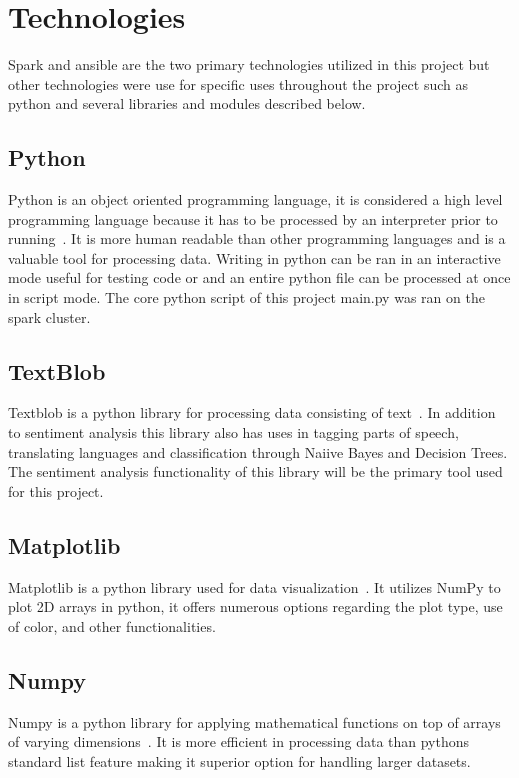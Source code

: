 \section{Technologies}

Spark and ansible are the two primary technologies utilized in this
project but other technologies were use for specific uses throughout
the project such as python and several libraries and modules described below.

\subsection{Python}
Python is an object oriented programming language, it is considered a
high level programming language because it has to be processed by an
interpreter prior to running~\cite{www-python}.  It is more human
readable than other programming languages and is a valuable tool for
processing data.  Writing in python can be ran in an interactive mode
useful for testing code or and an entire python file can be processed
at once in script mode.  The core python script of this project
main.py was ran on the spark cluster.

\subsection{TextBlob}

Textblob is a python library for processing data consisting of
text~\cite{www-textblob}.  In addition to sentiment analysis this
library also has uses in tagging parts of speech, translating languages
and classification through Naiive Bayes and Decision Trees.  The
sentiment analysis functionality of this library will be the primary
tool used for this project.

\subsection{Matplotlib}

Matplotlib is a python library used for data
visualization~\cite{www-matplot}.  It utilizes NumPy to plot 2D arrays
in python, it offers numerous options regarding the plot type, use of
color, and other functionalities.

\subsection{Numpy}

Numpy is a python library for applying mathematical functions on top
of arrays of varying dimensions~\cite{www-numpy}.  It is more
efficient in processing data than pythons standard list feature making
it superior option for handling larger datasets.

